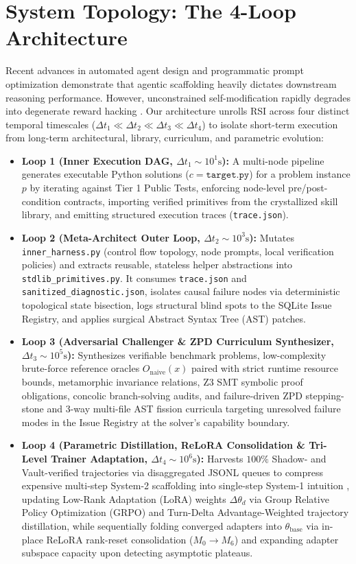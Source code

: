\documentclass[10pt,twocolumn,letterpaper]{article}
\begin{document}
\section{System Topology: The 4-Loop Architecture}
Recent advances in automated agent design \cite{hu2024,yin2024} and programmatic prompt optimization \cite{khattab2024,yuksekgonul2024} demonstrate that agentic scaffolding heavily dictates downstream reasoning performance. However, unconstrained self-modification rapidly degrades into degenerate reward hacking \cite{amodei2016}. Our architecture unrolls RSI across four distinct temporal timescales ($\Delta t_{1}\ll\Delta t_{2}\ll\Delta t_{3}\ll\Delta t_{4}$) to isolate short-term execution from long-term architectural, library, curriculum, and parametric evolution:
\begin{itemize}
    \item \textbf{Loop 1 (Inner Execution DAG, $\Delta t_{1}\sim 10^{1}\text{s}$):} A multi-node pipeline generates executable Python solutions ($c = \texttt{target.py}$) for a problem instance $p$ by iterating against Tier 1 Public Tests, enforcing node-level pre/post-condition contracts, importing verified primitives from the crystallized skill library, and emitting structured execution traces (\texttt{trace.json}).
    \item \textbf{Loop 2 (Meta-Architect Outer Loop, $\Delta t_{2}\sim 10^{3}\text{s}$):} Mutates \texttt{inner\_\allowbreak harness.py} (control flow topology, node prompts, local verification policies) and extracts reusable, stateless helper abstractions into \texttt{stdlib\_\allowbreak primitives.py}. It consumes \texttt{trace.json} and \texttt{sanitized\_\allowbreak diagnostic.json}, isolates causal failure nodes via deterministic topological state bisection, logs structural blind spots to the SQLite Issue Registry, and applies surgical Abstract Syntax Tree (AST) patches.
    \item \textbf{Loop 3 (Adversarial Challenger \& ZPD Curriculum Synthesizer, $\Delta t_{3}\sim 10^{5}\text{s}$):} Synthesizes verifiable benchmark problems, low-complexity brute-force reference oracles $O_{\text{naive}}(x)$ paired with strict runtime resource bounds, metamorphic invariance relations, Z3 SMT symbolic proof obligations, concolic branch-solving audits, and failure-driven ZPD stepping-stone and 3-way multi-file AST fission curricula targeting unresolved failure modes in the Issue Registry at the solver's capability boundary.
    \item \textbf{Loop 4 (Parametric Distillation, ReLoRA Consolidation \& Tri-Level Trainer Adaptation, $\Delta t_{4}\sim 10^{6}\text{s}$):} Harvests $100\%$ Shadow- and Vault-verified trajectories via disaggregated JSONL queues to compress expensive multi-step System-2 scaffolding into single-step System-1 intuition \cite{kahneman2011,zelikman2022}, updating Low-Rank Adaptation (LoRA) weights $\Delta\theta_{d}$ via Group Relative Policy Optimization (GRPO) \cite{shao2024,deepseek2025} and Turn-Delta Advantage-Weighted trajectory distillation, while sequentially folding converged adapters into $\theta_{\text{base}}$ via in-place ReLoRA rank-reset consolidation ($M_{0}\to M_{6}$) and expanding adapter subspace capacity upon detecting asymptotic plateaus.

\end{itemize}
\end{document}

